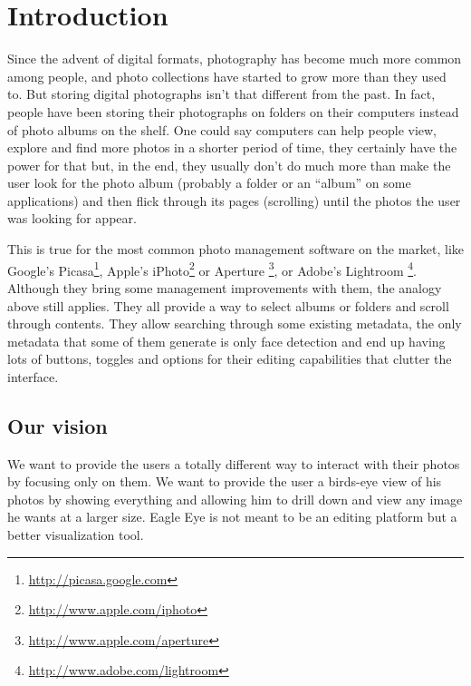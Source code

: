 \chapter{Introduction} %
\label{chapter:introduction}



Since the advent of digital formats, photography has become much more common among people, and photo collections have started to grow more than they used to. But storing digital photographs isn't that different from the past. In fact, people have been storing their photographs on folders on their computers instead of photo albums on the shelf. One could say computers can help people view, explore and find more photos in a shorter period of time, they certainly have the power for that but, in the end, they usually don't do much more than make the user look for the photo album (probably a folder or an ``album'' on some applications) and then flick through its pages (scrolling) until the photos the user was looking for appear.

This is true for the most common photo management software on the market, like Google's Picasa\footnote{\url{http://picasa.google.com}}, Apple's iPhoto\footnote{\url{http://www.apple.com/iphoto}} or Aperture \footnote{\url{http://www.apple.com/aperture}}, or Adobe's Lightroom \footnote{\url{http://www.adobe.com/lightroom}}. Although they bring some management improvements with them, the analogy above still applies. They all provide a way to select albums or folders and scroll through contents. They allow searching through some existing metadata, the only metadata that some of them generate is only face detection and end up having lots of buttons, toggles and options for their editing capabilities that clutter the interface.




\section{Our vision} %
\label{ssub:our_vision}


We want to provide the users a totally different way to interact with their photos by focusing only on them. We want to provide the user a birds-eye view of his photos by showing everything and allowing him to drill down and view any image he wants at a larger size. Eagle Eye is not meant to be an editing platform but a better visualization tool.

